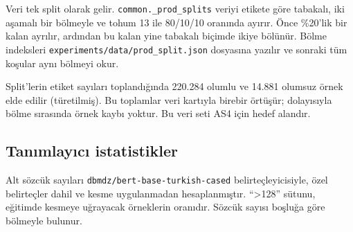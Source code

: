 \documentclass[11pt]{article}
\begin{document}
Veri tek split olarak gelir. \texttt{common.\allowbreak{}\allowbreak{}\_\allowbreak{}\allowbreak{}prod\_\allowbreak{}\allowbreak{}splits} veriyi etikete göre tabakalı, iki aşamalı bir bölmeyle ve tohum 13 ile 80/\allowbreak{}10/\allowbreak{}10 oranında ayırır. Önce \%20'lik bir kalan ayrılır, ardından bu kalan yine tabakalı biçimde ikiye bölünür. Bölme indeksleri \texttt{experiments/\allowbreak{}\allowbreak{}data/\allowbreak{}\allowbreak{}prod\_\allowbreak{}\allowbreak{}split.\allowbreak{}\allowbreak{}json} dosyasına yazılır ve sonraki tüm koşular aynı bölmeyi okur.

Split'lerin etiket sayıları toplandığında 220.284 olumlu ve 14.881 olumsuz örnek elde edilir (türetilmiş). Bu toplamlar veri kartıyla birebir örtüşür; dolayısıyla bölme sırasında örnek kaybı yoktur. Bu veri seti AS4 için hedef alandır.

\subsection{Tanımlayıcı istatistikler}

Alt sözcük sayıları \texttt{dbmdz/\allowbreak{}\allowbreak{}bert-{}\allowbreak{}base-{}\allowbreak{}turkish-{}\allowbreak{}cased} belirteçleyicisiyle, özel belirteçler dahil ve kesme uygulanmadan hesaplanmıştır. ``>128'' sütunu, eğitimde kesmeye uğrayacak örneklerin oranıdır. Sözcük sayısı boşluğa göre bölmeyle bulunur.
\end{document}
